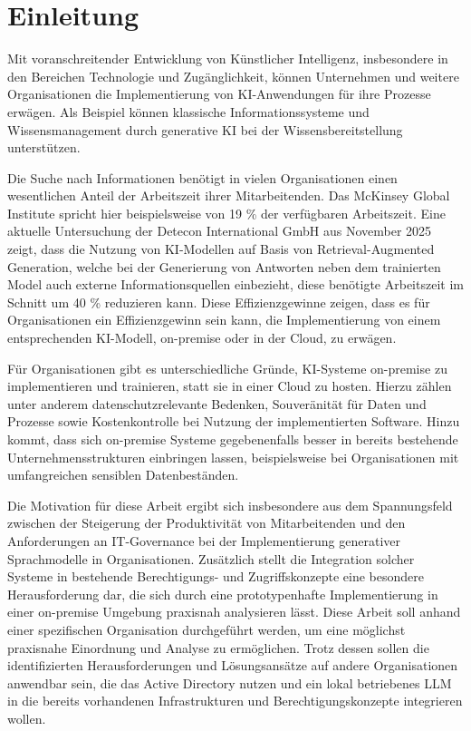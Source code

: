 \section{Einleitung}
Mit voranschreitender Entwicklung von Künstlicher Intelligenz, insbesondere in den Bereichen Technologie und Zugänglichkeit, können Unternehmen und weitere Organisationen die Implementierung von KI-Anwendungen für ihre Prozesse erwägen. Als Beispiel können klassische Informationssysteme und Wissensmanagement durch generative KI bei der Wissensbereitstellung unterstützen. 

Die Suche nach Informationen benötigt in vielen Organisationen einen wesentlichen Anteil der Arbeitszeit ihrer Mitarbeitenden. Das McKinsey Global Institute spricht hier beispielsweise von 19 \% der verfügbaren Arbeitszeit.\autocite[Vgl.][]{chuiSocialEconomyUnlocking} Eine aktuelle Untersuchung der Detecon International GmbH aus November 2025 zeigt, dass die Nutzung von KI-Modellen auf Basis von Retrieval-Augmented Generation, welche bei der Generierung von Antworten neben dem trainierten Model auch externe Informationsquellen einbezieht, diese benötigte Arbeitszeit im Schnitt um 40 \% reduzieren kann.\autocite[Vgl.][]{deteconinternationalgmbhhrsg.GenerativeAIRevolutionizing2025} Diese Effizienzgewinne zeigen, dass es für Organisationen ein Effizienzgewinn sein kann, die Implementierung von einem entsprechenden KI-Modell, on-premise oder in der Cloud, zu erwägen.

Für Organisationen gibt es unterschiedliche Gründe, KI-Systeme on-premise zu implementieren und trainieren, statt sie in einer Cloud zu hosten. Hierzu zählen unter anderem datenschutzrelevante Bedenken, Souveränität für Daten und Prozesse sowie Kostenkontrolle bei Nutzung der implementierten Software. Hinzu kommt, dass sich on-premise Systeme gegebenenfalls besser in bereits bestehende Unternehmensstrukturen einbringen lassen, beispielsweise bei Organisationen mit umfangreichen sensiblen Datenbeständen.

Die Motivation für diese Arbeit ergibt sich insbesondere aus dem Spannungsfeld zwischen der Steigerung der Produktivität von Mitarbeitenden und den Anforderungen an IT-Governance bei der Implementierung generativer Sprachmodelle in Organisationen. Zusätzlich stellt die Integration solcher Systeme in bestehende Berechtigungs- und Zugriffskonzepte eine besondere Herausforderung dar, die sich durch eine prototypenhafte Implementierung in einer on-premise Umgebung praxisnah analysieren lässt. Diese Arbeit soll anhand einer spezifischen Organisation durchgeführt werden, um eine möglichst praxisnahe Einordnung und Analyse zu ermöglichen. Trotz dessen sollen die identifizierten Herausforderungen und Lösungsansätze auf andere Organisationen anwendbar sein, die das Active Directory nutzen und ein lokal betriebenes LLM in die bereits vorhandenen Infrastrukturen und Berechtigungskonzepte integrieren wollen. 

